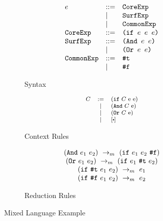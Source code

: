 \begin{figure}[t]
\centering
\begin{subfigure}{\linewidth}{\footnotesize
    \begin{flushleft}
        \[
        \begin{array}{lll}
        e &::=& \mbox{\tt CoreExp} \\
        &|&\mbox{\tt SurfExp}\\
        &|&\mbox{\tt CommonExp}\\
        \mbox{\tt CoreExp} &::=& \texttt{(if~$e$~$e$~$e$)}\\
        \mbox{\tt SurfExp} &::=& \texttt{(And~$e$~$e$)}\\
        &|&\texttt{(Or~$e$~$e$)}\\
        \mbox{\tt CommonExp} &::=& \mbox{\tt \#t}\\
        &|& \mbox{\tt \#f}\\
        \end{array}
        \]
    \end{flushleft}
    \caption{Syntax}
    \label{fig:mixsyntax}
}
\end{subfigure}
\begin{subfigure}{\linewidth}{\footnotesize
    \begin{flushleft}
        \[\footnotesize
        \begin{array}{lcl}
        C &:=& (\m{if}~C~$e$~$e$)\\
        &|& (\m{And}~C~$e$)\\
        &|& (\m{Or}~C~$e$)\\
        &|&[\bigcdot]\\
        \end{array}
        \]
        \end{flushleft}
    \caption{Context Rules}
    \label{fig:mixcontext}
}
\end{subfigure}

\begin{subfigure}{\linewidth}{\footnotesize
    \begin{flushleft}
        \[
        \begin{array}{c}
        (\mbox{\tt And}~e_1~e_2) ~\rightarrow_m~(\mbox{\tt if}~e_1~e_2~\mbox{\tt \#f})\\
        (\mbox{\tt Or}~e_1~e_2) ~\rightarrow_m~(\mbox{\tt if}~e_1~\mbox{\tt \#t}~e_2)\\
        (\mbox{\tt if}~\mbox{\tt \#t}~e_1~e_2) ~\rightarrow_m~e_1\\
        (\mbox{\tt if}~\mbox{\tt \#f}~e_1~e_2) ~\rightarrow_m~e_2
        \end{array}
        \]
    \end{flushleft}
    \caption{Reduction Rules}
    \label{fig:mixreduction}
}
\end{subfigure}

\caption{Mixed Language Example}
\label{fig:mixexample}
\end{figure}


